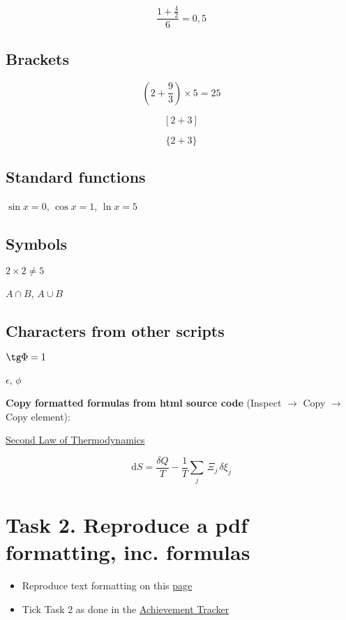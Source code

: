 \documentclass[a4paper,11pt]{article}
\begin{document}
\[\frac{1+\frac{4}{2}}{6} = 0,5\]

\subsection{Brackets}

\[ \left(2+\frac{9}{3}\right) \times 5 = 25 \]

\[  [2+3]  \]

\[ \{2+3\}  \]

\subsection{Standard functions}

$\sin x = 0$, $\cos x = 1$, $\ln x = 5$

\subsection{Symbols}

$2\times 2 \ne 5$

$A \cap B$, $A \cup B$

\subsection{Characters from other scripts}

$\tg \Phi = 1$

$\epsilon$, $\phi$

\bigskip


\textbf{{\color{red}Copy formatted formulas from html source code}} (Inspect $\rightarrow$ Copy $\rightarrow$ Copy element):

 \href{https://en.wikipedia.org/wiki/Second_law_of_thermodynamics}{Second Law of Thermodynamics}
 
\[\mathrm {d} S={\frac {\delta Q}{T}}-{\frac {1}{T}}\sum _{j}\,\Xi _{j}\,\delta \xi _{j}\]



\section*{Task 2. Reproduce a pdf formatting, inc. formulas}
\label{task}

\begin{tcolorbox}[width=\textwidth, colback={yellow!40!white}, title={}, colbacktitle=yellow!60!white, coltitle=black]
	\begin{itemize}
		\item Reproduce text formatting on this \href{https://github.com/kunilovskaya/dskills_workshop/blob/main/w1_latex_basics/s2/practice2.pdf}{page}
		\item Tick Task 2 as done in the \href{https://docs.google.com/document/d/17ZBAQGBKIlO6JMwxz3LlghYq1sdsUjhHVXga46BK0kg/edit?usp=sharing}{Achievement Tracker}
	\end{itemize}
	
\end{tcolorbox}%
\end{document}

